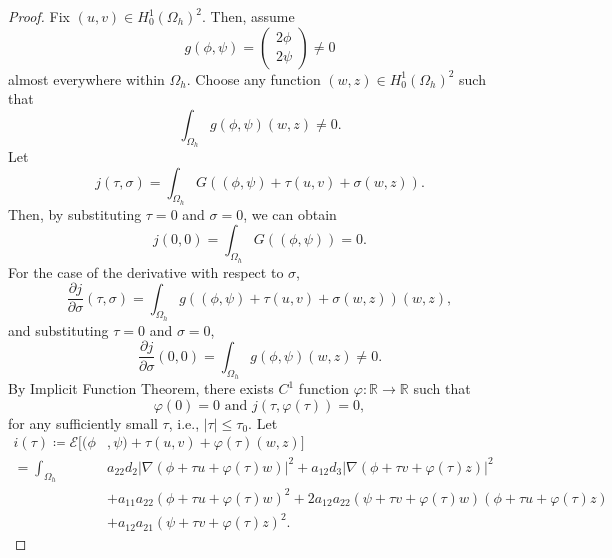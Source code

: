 \documentclass[11pt]{amsart}
\numberwithin{equation}{section}
\theoremstyle{plain}
\theoremstyle{definition}
\begin{document}
\begin{proof}
	Fix $(u,v)\in H_0^1(\Omega_h)^2$. Then, assume
	\begin{equation*}
		g(\phi, \psi)=\begin{pmatrix} 2\phi \\
		2\psi \end{pmatrix} \neq 0
	\end{equation*}
	almost everywhere within $\Omega_h$.
	Choose any function $(w,z)\in H_0^1(\Omega_h)^2$ such that 
	\begin{equation*}
		\int_{\Omega_h}g(\phi, \psi)(w,z)\neq 0.
	\end{equation*}
	Let
	\begin{equation*}
		j(\tau, \sigma)=\int_{\Omega_h}G((\phi,\psi)+\tau(u,v)+\sigma(w,z)).
	\end{equation*}
	Then, by substituting $\tau=0$ and $\sigma=0$, we can obtain
	\begin{equation*}
		j(0,0)=\int_{\Omega_h}G((\phi,\psi))=0.
	\end{equation*}
	For the case of the derivative with respect to $\sigma$,
	\begin{equation*}
		\frac{\partial j}{\partial \sigma}(\tau, \sigma)=\int_{\Omega_h}g((\phi,\psi)+\tau(u,v)+\sigma(w,z))(w,z),
	\end{equation*}
	and substituting $\tau=0$ and $\sigma=0$,
	\begin{equation*}
		\frac{\partial j}{\partial \sigma}(0,0)=\int_{\Omega_h}g(\phi,\psi)(w,z)\neq 0.
	\end{equation*}
	By Implicit Function Theorem, there exists $C^1$ function $\varphi : \mathbb{R} \to \mathbb{R}$ such that
	\begin{equation*}
		\varphi(0)=0 \text{ and } j(\tau,\varphi(\tau))=0,
	\end{equation*}
	for any sufficiently small $\tau$, i.e., $\lvert \tau \rvert \leq \tau_0$.
	Let
	\begin{equation*}
	\begin{aligned}
		i(\tau) \coloneqq \mathcal{E}[(\phi&, \psi)+\tau(u,v)+\varphi(\tau)(w,z)]\\
		=\int_{\Omega_h}&a_{22}d_2\lvert \nabla (\phi+\tau u+\varphi(\tau)w)\rvert^2+a_{12}d_3\lvert \nabla (\phi+\tau v+\varphi(\tau)z)\rvert^2\\
		&+a_{11}a_{22}(\phi+\tau u+\varphi(\tau)w)^2+2a_{12}a_{22}(\psi+\tau v+\varphi(\tau)w)(\phi+\tau u+\varphi(\tau)z)\\
		&+a_{12}a_{21}(\psi+\tau v+\varphi(\tau)z)^2.
	\end{aligned}

\end{equation*}
\end{proof}
\end{document}
